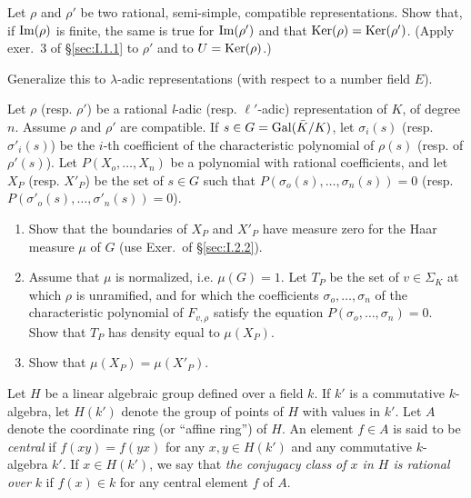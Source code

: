 \begin{exercises}
\begin{nlist}
\item Let $\rho$ and $\rho'$ be two rational, semi-simple, compatible
representations.  Show that, if $\mathrm{Im}(\rho)$ is finite, the same is
true for $\mathrm{Im}(\rho')$ and that $\mathrm{Ker}(\rho) = \mathrm{Ker}(\rho')$.  (Apply
exer.~3 of \S\ref{sec:I.1.1} to $\rho'$ and to $U = \mathrm{Ker}(\rho)$.)

Generalize this to $\lambda$-adic representations (with respect to a
number field $E$).

\item Let $\rho$ (resp. $\rho'$) be a rational \textit{l}-adic
(resp. $\ell'$-adic) representation of $K$, of degree $n$.  Assume
$\rho$ and $\rho'$ are compatible.  If $s \in G = \mathrm{Gal}(\bar{K}/K)$,
let $\sigma_i(s)$ (resp. $\sigma'_i(s)$) be the $i$-th coefficient of
the characteristic polynomial of $\rho(s)$ (resp. of $\rho'(s)$).
Let $P(X_o, \ldots, X_n)$ be a polynomial with rational coefficients,
and let $X_P$ (resp. $X'_P$) be the set of $s \in G$ such that
$P(\sigma_o(s), \ldots, \sigma_n(s)) = 0$ (resp.
$P(\sigma'_o(s), \ldots, \sigma'_n(s)) = 0$).
\begin{enumerate}[label=\alph*),leftmargin=2.2em,itemsep=0.15ex,topsep=0.4ex]
\item Show that the boundaries of $X_P$ and $X'_P$ have measure zero
for the Haar measure $\mu$ of $G$ (use Exer.~of \S\ref{sec:I.2.2}).
\item Assume that $\mu$ is normalized, i.e. $\mu(G) = 1$.  Let $T_P$
be the set of $v \in \Sigma_K$ at which $\rho$ is unramified, and for
which the coefficients $\sigma_o, \ldots, \sigma_n$ of the
characteristic polynomial of $F_{v,\rho}$ satisfy the equation
$P(\sigma_o, \ldots, \sigma_n) = 0$.  Show that $T_P$ has density
equal to $\mu(X_P)$.
\item Show that $\mu(X_P) = \mu(X'_P)$.
\end{enumerate}
\end{nlist}
\end{exercises}


Let $H$ be a linear algebraic group defined over a field $k$.  If $k'$
is a commutative $k$-algebra, let $H(k')$ denote the group of points
of $H$ with values in $k'$.  Let $A$ denote the coordinate ring (or
``affine ring'') of $H$.  An element $f \in A$ is said to be
\emph{central} if $f(xy) = f(yx)$ for any $x, y \in H(k')$ and any
commutative $k$-algebra $k'$.  If $x \in H(k')$, we say that
\emph{the conjugacy class of $x$ in $H$ is rational over} $k$ if
$f(x) \in k$ for any central element $f$ of $A$.

